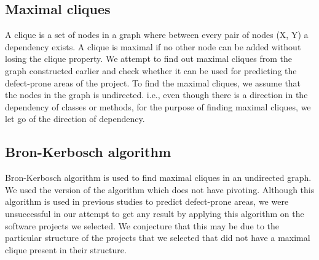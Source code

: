 \subsection{Maximal cliques}
A clique is a set of nodes in a graph where between every pair of nodes (X, Y) a dependency exists. A clique is maximal if no other node can be added without losing the clique property\cite{zimmermann2008predicting}. We attempt to find out maximal cliques from the graph constructed earlier and check whether it can be used for predicting the defect-prone areas of the project. To find the maximal cliques, we assume that the nodes in the graph is undirected. i.e., even though there is a direction in the dependency of classes or methods, for the purpose of finding maximal cliques, we let go of the direction of dependency.

\subsection{Bron-Kerbosch algorithm}
Bron-Kerbosch algorithm\cite{bron1973algorithm} is used to find maximal cliques in an undirected graph. We used the version of the algorithm which does not have pivoting. Although this algorithm is used in previous studies\cite{zimmermann2008predicting} to predict defect-prone areas, we were unsuccessful in our attempt to get any result by applying this algorithm on the software projects we selected. We conjecture that this may be due to the particular structure of the projects that we selected that did not have a maximal clique present in their structure.

